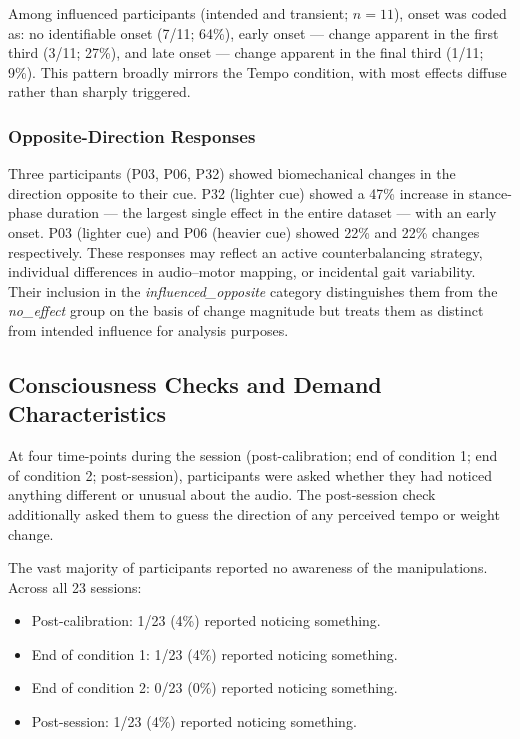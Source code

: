 Among influenced participants (intended and transient; $n = 11$), onset was
coded as: no identifiable onset (7/11; 64\%), early onset --- change apparent in
the first third (3/11; 27\%), and late onset --- change apparent in the final
third (1/11; 9\%). This pattern broadly mirrors the Tempo condition, with most
effects diffuse rather than sharply triggered.

\subsubsection{Opposite-Direction Responses}

Three participants (P03, P06, P32) showed biomechanical changes in the
direction opposite to their cue. P32 (lighter cue) showed a 47\% increase in
stance-phase duration --- the largest single effect in the entire dataset ---
with an early onset. P03 (lighter cue) and P06 (heavier cue) showed 22\% and
22\% changes respectively. These responses may reflect an active
counterbalancing strategy, individual differences in audio--motor mapping, or
incidental gait variability. Their inclusion in the \textit{influenced\_opposite}
category distinguishes them from the \textit{no\_effect} group on the basis of
change magnitude but treats them as distinct from intended influence for
analysis purposes.

\subsection{Consciousness Checks and Demand Characteristics}
\label{sec:results:consciousness}

At four time-points during the session (post-calibration; end of condition 1;
end of condition 2; post-session), participants were asked whether they had
noticed anything different or unusual about the audio. The post-session check
additionally asked them to guess the direction of any perceived tempo or weight
change.

The vast majority of participants reported no awareness of the manipulations.
Across all 23 sessions:

\begin{itemize}
    \item Post-calibration: 1/23 (4\%) reported noticing something.
    \item End of condition 1: 1/23 (4\%) reported noticing something.
    \item End of condition 2: 0/23 (0\%) reported noticing something.
    \item Post-session: 1/23 (4\%) reported noticing something.
\end{itemize}

